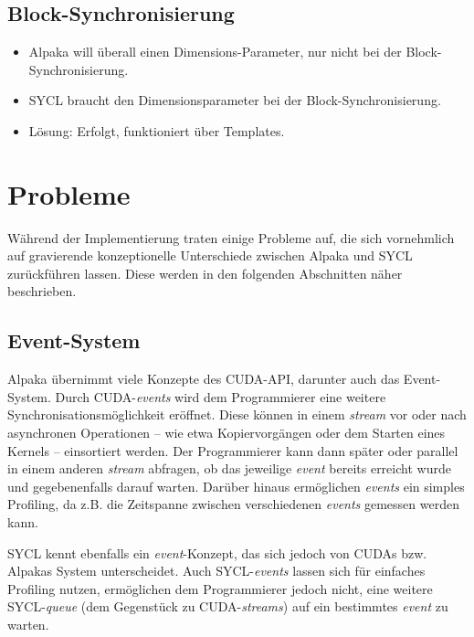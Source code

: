 \subsection{Block-Synchronisierung}
\label{implementierung:besonderheiten:synchronisierung}

\begin{itemize}
    \item Alpaka will überall einen Dimensions-Parameter, nur nicht bei der
          Block-Synchronisierung.
    \item SYCL braucht den Dimensionsparameter bei der Block-Synchronisierung.
    \item Lösung: Erfolgt, funktioniert über Templates.
\end{itemize}

\section{Probleme}\label{implementierung:probleme}

Während der Implementierung traten einige Probleme auf, die sich vornehmlich
auf gravierende konzeptionelle Unterschiede zwischen Alpaka und SYCL
zurückführen lassen. Diese werden in den folgenden Abschnitten näher
beschrieben.

\subsection{Event-System}\label{implementierung:probleme:events}

Alpaka übernimmt viele Konzepte des CUDA-API, darunter auch das Event-System.
Durch CUDA-\textit{events} wird dem Programmierer eine weitere
Synchronisationsmöglichkeit eröffnet. Diese können in einem \textit{stream} vor
oder nach asynchronen Operationen -- wie etwa Kopiervorgängen oder dem Starten
eines Kernels -- einsortiert werden. Der Programmierer kann dann später oder
parallel in einem anderen \textit{stream} abfragen, ob das jeweilige
\textit{event} bereits erreicht wurde und gegebenenfalls darauf warten. Darüber
hinaus ermöglichen \textit{events} ein simples Profiling, da z.B. die Zeitspanne
zwischen verschiedenen \textit{events} gemessen werden kann.

SYCL kennt ebenfalls ein \textit{event}-Konzept, das sich jedoch von CUDAs bzw.
Alpakas System unterscheidet. Auch SYCL-\textit{events} lassen sich für
einfaches Profiling nutzen, ermöglichen dem Programmierer jedoch nicht, eine
weitere SYCL-\textit{queue} (dem Gegenstück zu CUDA-\textit{streams}) auf ein
bestimmtes \textit{event} zu warten.

